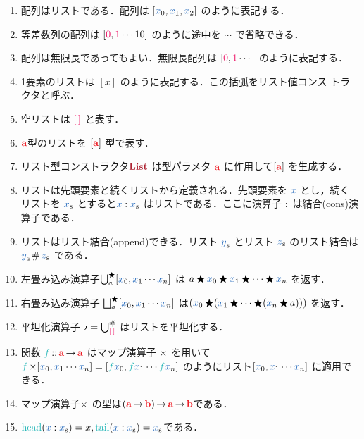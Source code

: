\documentclass[a5paper,twoside,fleqn,draft]{jsbook}
\begin{document}
\begin{enumerate}
\item 配列はリストである．配列は $[\hVar{x}_0,\hVar{x}_1,\hVar{x}_2]$ のように表記する．
\item 等差数列の配列は $[\hConstant{0},\hConstant{1}\dotsb10]$ のように途中を $\dotsb$ で省略できる．
\item 配列は無限長であってもよい．無限長配列は $[\hConstant{0},\hConstant{1}\dotsb]$ のように表記する．
\item 1要素のリストは $[x]$ のように表記する．この括弧をリスト値コンス
  トラクタと呼ぶ．
\item 空リストは $\mEmptyList$ と表す．
\item $\hTypeName{a}$型のリストを $\hListConstruct{\hTypeName{a}}$ 型で表す．
\item リスト型コンストラクタ$\mListTypeConstructor$ は型パラメタ $\hTypeName{a}$ に作用して$\hListConstruct{\hTypeName{a}}$ を生成する．
\item リストは先頭要素と続くリストから定義される．先頭要素を $\hVar{x}$ とし，続くリストを $\hListVar{x}$ とすると$\hVar{x}:\hListVar{x}$ はリストである．ここに演算子 $:$ は結合(cons)演算子である．
\item リストはリスト結合(append)できる．リスト $\hListVar{y}$ とリスト $\hListVar{z}$ のリスト結合は $\hListVar{y}\hAppend\hListVar{z}$ である．
\item 左畳み込み演算子$\mFold^{\hAnyBinOp}_a[\hVar{x}_0,\hVar{x}_1\dotsb \hVar{x}_n]$ は $a\hAnyBinOp \hVar{x}_0\hAnyBinOp \hVar{x}_1\hAnyBinOp\dotsb\hAnyBinOp \hVar{x}_n$ を返す．
\item 右畳み込み演算子 $\mFoldRight^{\hAnyBinOp}_{a}[\hVar{x}_0,\hVar{x}_1\dotsb \hVar{x}_n]$ は$(\hVar{x}_0\hAnyBinOp(\hVar{x}_1\hAnyBinOp\dotsb\hAnyBinOp(\hVar{x}_n\hAnyBinOp a)))$ を返す．
\item 平坦化演算子 $\mJoinList=\mFold_\mEmptyList^{\hAppend}$ はリストを平坦化する．
\item 関数 $\hFunc{f}\hIsTypeOf\mProjEXP{\hTypeName{a} }{\hTypeName{a} }$ はマップ演算子 $\operatorname{\times}$ を用いて $\hFunc{f}\hMap[\hVar{x}_0,\hVar{x}_1\dotsb \hVar{x}_n]=[\hFunc{f}\hVar{x}_0,\hFunc{f}\hVar{x}_1\dotsb \hFunc{f}\hVar{x}_n]$ のようにリスト$[\hVar{x}_0,\hVar{x}_1\dotsb \hVar{x}_n]$ に適用できる．
\item マップ演算子$\operatorname{\times}$ の型は$\mProjEXP{(\mProjEXP{\hTypeName{a} }{\hTypeName{b}})}{\mProjEXP{\hTypeName{a} }{\hTypeName{b} }}$である．
\item $\mHead(\hVar{x}:\hListVar{x})=x,\mTail(\hVar{x}:\hListVar{x})=\hListVar{x}$である．
\end{enumerate}
\end{document}

